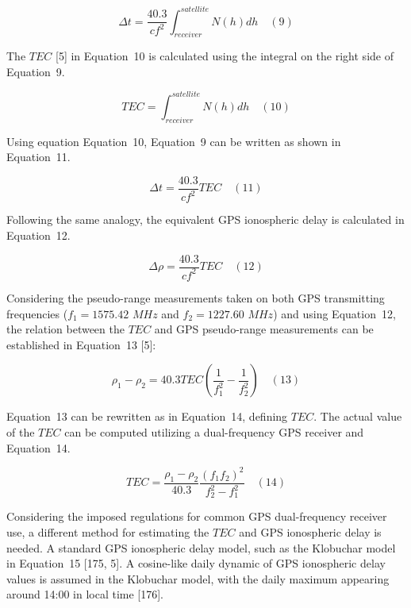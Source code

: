 \documentclass[sn-mathphys-num]{sn-jnl}%
\begin{document}
\begin{equation}
	\Delta t = \frac{40.3}{c f^{2}} \int_{receiver}^{satellite} N(h)dh
	\quad\left(9\right)
\end{equation}

The $TEC$ [5] in Equation~10 is calculated using the integral on the right side of Equation~9.

\begin{equation}
	TEC = \int_{receiver}^{satellite} N(h)dh
	\quad\left(10\right)
\end{equation}

Using equation Equation~10, Equation~9 can be written as shown in Equation~11.

\begin{equation}
	\Delta t = \frac{40.3}{c f^{2}} TEC
	\quad\left(11\right)
\end{equation}

Following the same analogy, the equivalent GPS ionospheric delay is calculated in Equation~12.

\begin{equation}
	\Delta \rho = \frac{40.3}{c f^{2}} TEC
	\quad\left(12\right)
\end{equation}

Considering the pseudo-range measurements taken on both GPS transmitting frequencies ($f_{1}=1575.42$ $MHz$ and $f_{2}=1227.60$ $MHz$) and using Equation~12, the relation between the $TEC$ and GPS pseudo-range measurements can be established in Equation~13 [5]:
 
\begin{equation}
	\rho_{1} - \rho_{2} = 40.3 TEC \left( \frac{1}{f_{1}^{2}} - \frac{1}{f_{2}^{2}} \right)
	\quad\left(13\right)
\end{equation}

Equation~13 can be rewritten as in Equation~14, defining $TEC$. The actual value of the $TEC$ can be computed utilizing a dual-frequency GPS receiver and Equation~14.

\begin{equation}
	TEC = \frac{\rho_{1} - \rho_{2}}{40.3} \frac{{\left(f_{1}f_{2}\right)}^{2}}{f_{2}^{2}-f_{1}^{2}}
	\quad\left(14\right)
\end{equation}

Considering the imposed regulations for common GPS dual-frequency receiver use, a different method for estimating the $TEC$ and GPS ionospheric delay is needed. A standard GPS ionospheric delay model, such as the Klobuchar model in Equation~15 [175, 5]. A cosine-like daily dynamic of GPS ionospheric delay values is assumed in the Klobuchar model, with the daily maximum appearing around 14:00 in local time [176].
\end{document}
